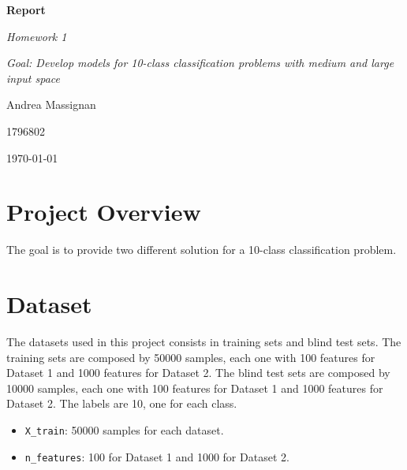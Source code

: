 \documentclass{article}
\begin{document}
\begin{titlepage}
  \centering
  \vspace*{2cm}
  {\Huge\bfseries Report\par}
  \vspace{2cm}
  {\Large\itshape Homework 1\par}
  \vspace{0.5cm}
  {\large\itshape Goal: Develop models for 10-class classification problems with medium and large input space\par}
  \vfill
  {\Large Andrea Massignan\par}
  {\Large 1796802\par}
  \vfill
  {\large\today\par}
\end{titlepage}

\begin{titlepage}

  \section*{Project Overview}

  The goal is to provide two different solution for a 10-class classification problem.

  \section{Dataset}

  The datasets used in this project consists in training sets and blind test sets.
  The training sets are composed by 50000 samples, each one with 100 features for Dataset 1 and 1000 features for Dataset 2.
  The blind test sets are composed by 10000 samples, each one with 100 features for Dataset 1 and 1000 features for Dataset 2.
  The labels are 10, one for each class.

  \begin{itemize}
    \item \texttt{X\_train}: 50000 samples for each dataset.
    \item \texttt{n\_features}: 100 for Dataset 1 and 1000 for Dataset 2.

  \end{itemize}


\end{titlepage}
\end{document}

